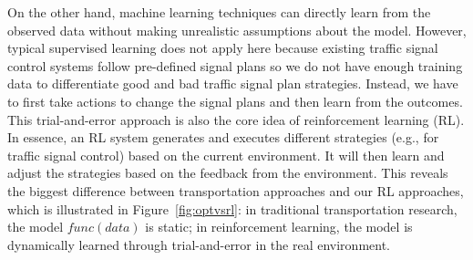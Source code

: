 On the other hand, machine learning techniques can directly learn from the observed data without making unrealistic assumptions about the model. However, typical supervised learning does not apply here because existing traffic signal control systems follow pre-defined signal plans so we do not have enough training data to differentiate good and bad traffic signal plan strategies. Instead, we have to first take actions to change the signal plans and then learn from the outcomes. This trial-and-error approach is also the core idea of reinforcement learning (RL). In essence, an RL system generates and executes different strategies (e.g., for traffic signal control) based on the current environment. It will then learn and adjust the strategies based on the feedback from the environment. This reveals the biggest difference between transportation approaches and our RL approaches, which is illustrated in Figure~\ref{fig:optvsrl}: in traditional transportation research, the model $func(data)$ is static; in reinforcement learning, the model is dynamically learned through trial-and-error in the real environment.





